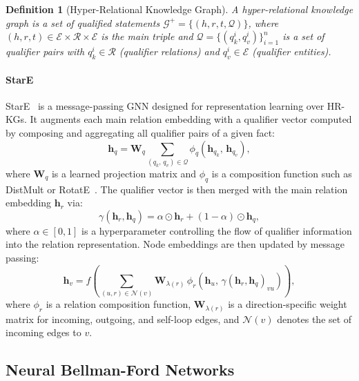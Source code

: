 \documentclass[10pt,journal,compsoc]{IEEEtran}
\newtheorem{definition}{Definition}[section]
\begin{document}
\begin{definition}[Hyper-Relational Knowledge Graph]
\label{def:hrkg}
A hyper-relational knowledge graph is a set of qualified
statements $\mathcal{G}^+ = \{(h, r, t, \mathcal{Q})\}$,
where $(h, r, t) \in \mathcal{E} \times \mathcal{R}
\times \mathcal{E}$ is the main triple and
$\mathcal{Q} = \{(q_k^i, q_v^i)\}_{i=1}^{n}$
is a set of qualifier pairs with
$q_k^i \in \mathcal{R}$ (qualifier relations) and
$q_v^i \in \mathcal{E}$ (qualifier entities).
\end{definition}

\paragraph*{StarE}
StarE~\cite{galkin2020message} is a message-passing GNN
designed for representation learning over HR-KGs.
It augments each main relation embedding with a
qualifier vector computed by composing and aggregating
all qualifier pairs of a given fact:
\begin{equation}
  \mathbf{h}_q = \mathbf{W}_q
    \sum_{(q_k,\,q_v)\in\mathcal{Q}}
    \phi_q(\mathbf{h}_{q_k},\,\mathbf{h}_{q_v}),
  \label{eq:stare_qual}
\end{equation}
where $\mathbf{W}_q$ is a learned projection matrix and
$\phi_q$ is a composition function such as DistMult or
RotatE~\cite{sun2019rotate}.
The qualifier vector is then merged with the main relation
embedding $\mathbf{h}_r$ via:
\begin{equation}
  \gamma(\mathbf{h}_r,\mathbf{h}_q)
    = \alpha \odot \mathbf{h}_r
    + (1-\alpha) \odot \mathbf{h}_q,
  \label{eq:stare_gamma}
\end{equation}
where $\alpha \in [0,1]$ is a hyperparameter controlling
the flow of qualifier information into the relation
representation. Node embeddings are then updated by
message passing:
\begin{equation}
  \mathbf{h}_v = f\!\left(
    \sum_{(u,r)\in\mathcal{N}(v)}
    \mathbf{W}_{\lambda(r)}\,
    \phi_r\!\left(\mathbf{h}_u,\,
    \gamma(\mathbf{h}_r,\mathbf{h}_q)_{vu}\right)
  \right),
  \label{eq:stare_update}
\end{equation}
where $\phi_r$ is a relation composition function,
$\mathbf{W}_{\lambda(r)}$ is a direction-specific weight
matrix for incoming, outgoing, and self-loop edges, and
$\mathcal{N}(v)$ denotes the set of incoming edges to $v$.

\subsection{Neural Bellman-Ford Networks}
\label{ssec:nbfnet}
\end{document}
